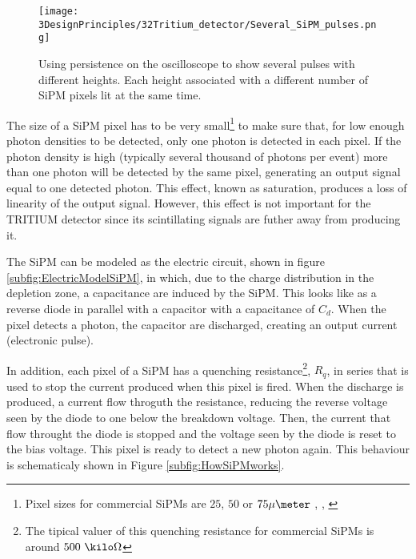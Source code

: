 \begin{figure}[htbp]
\centering
\texttt{[image: 3DesignPrinciples/32Tritium\_detector/Several\_SiPM\_pulses.png]}
\caption{Using persistence on the oscilloscope to show several pulses with different heights. Each height associated with a different number of  SiPM pixels lit at the same time.\label{fig:PulsesOfSiPM}}
\end{figure}

The size of a SiPM pixel has to be very small\footnote{Pixel sizes for commercial SiPMs are $25$, $50$ or $75\mu\meter$ \cite{DataSheetHammamatsu_1_SiPM_25}, \cite{DataSheetHammamatsu_1_SiPM_50}, \cite{DataSheetHammamatsu_1_SiPM_75}} to make sure that, for low enough photon densities to be detected, only one photon is detected in each pixel. If the photon density is high (typically several thousand of photons per event) more than one photon will be detected by the same pixel, generating an output signal equal to one detected photon. This effect, known as saturation, produces a loss of linearity of the output signal. However, this effect is not important for the TRITIUM detector since its scintillating signals are futher away from producing it. %

The SiPM can be modeled as the electric circuit, shown in figure \ref{subfig:ElectricModelSiPM}, in which, due to the charge distribution in the depletion zone, a capacitance are induced by the SiPM. This looks like as a reverse diode in parallel with a capacitor with a capacitance of $C_d$. When the pixel detects a photon, the capacitor are discharged, creating an output current (electronic pulse).

In addition, each pixel of a SiPM has a quenching resistance\footnote{The tipical valuer of this quenching resistance for commercial SiPMs is around $500~\kilo\Omega$}, $R_q$, in series that is used to stop the current produced when this pixel is fired. When the discharge is produced, a current flow throguth the resistance, reducing the reverse voltage seen by the diode to one below the breakdown voltage. Then, the current that flow throught the diode is stopped and the voltage seen by the diode is reset to the bias voltage. This pixel is ready to detect a new photon again. This behaviour is schematicaly shown in Figure \ref{subfig:HowSiPMworks}.

